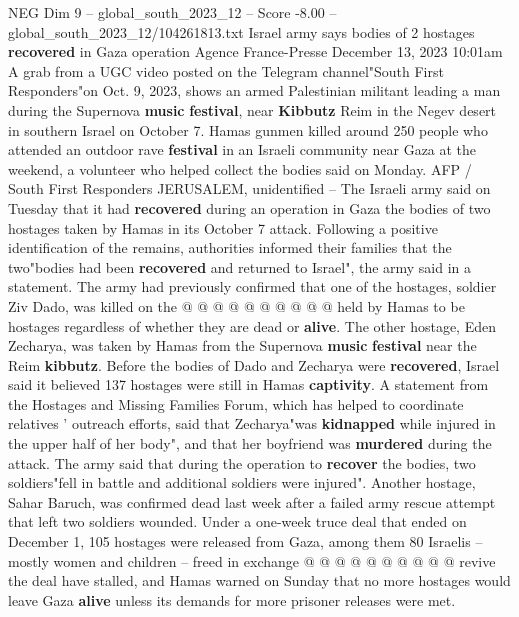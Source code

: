 \begin{textsample}{NEG Dim 9 – global\_south\_2023\_12 – Score -8.00 – global\_south\_2023\_12/104261813.txt}  \label{ex:f9_neg_303}
Israel army says bodies of 2 hostages \textbf{recovered} in Gaza operation Agence France-Presse December 13, 2023 10:01am A grab from a UGC video posted on the Telegram channel"South First Responders"on Oct. 9, 2023, shows an armed Palestinian militant leading a man during the Supernova \textbf{music} \textbf{festival}, near \textbf{Kibbutz} Reim in the Negev desert in southern Israel on October 7.
Hamas gunmen killed around 250 people who attended an outdoor rave \textbf{festival} in an Israeli community near Gaza at the weekend, a volunteer who helped collect the bodies said on Monday.
AFP / South First Responders JERUSALEM, unidentified -- The Israeli army said on Tuesday that it had \textbf{recovered} during an operation in Gaza the bodies of two hostages taken by Hamas in its October 7 attack.
Following a positive identification of the remains, authorities informed their families that the two"bodies had been \textbf{recovered} and returned to Israel", the army said in a statement.
The army had previously confirmed that one of the hostages, soldier Ziv Dado, was killed on the @ @ @ @ @ @ @ @ @ @ held by Hamas to be hostages regardless of whether they are dead or \textbf{alive}.
The other hostage, Eden Zecharya, was taken by Hamas from the Supernova \textbf{music} \textbf{festival} near the Reim \textbf{kibbutz}.
Before the bodies of Dado and Zecharya were \textbf{recovered}, Israel said it believed 137 hostages were still in Hamas \textbf{captivity}.
A statement from the Hostages and Missing Families Forum, which has helped to coordinate relatives ' outreach efforts, said that Zecharya"was \textbf{kidnapped} while injured in the upper half of her body", and that her boyfriend was \textbf{murdered} during the attack.
The army said that during the operation to \textbf{recover} the bodies, two soldiers"fell in battle and additional soldiers were injured".
Another hostage, Sahar Baruch, was confirmed dead last week after a failed army rescue attempt that left two soldiers wounded.
Under a one-week truce deal that ended on December 1, 105 hostages were released from Gaza, among them 80 Israelis -- mostly women and children -- freed in exchange @ @ @ @ @ @ @ @ @ @ revive the deal have stalled, and Hamas warned on Sunday that no more hostages would leave Gaza \textbf{alive} unless its demands for more prisoner releases were met.

\end{textsample}
